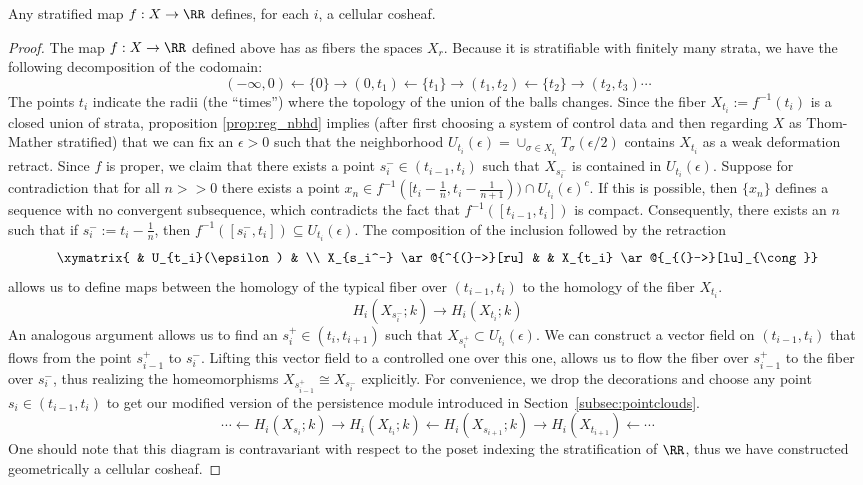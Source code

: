 \begin{lem}\label{lem:strat_maps_1d}
	Any stratified map $f:X\to\RR$ defines, for each $i$, a cellular cosheaf.
\end{lem}
\begin{proof}
The map $f:X\to \RR$ defined above has as fibers the spaces $X_r$. Because it is stratifiable with finitely many strata, we have the following decomposition of the codomain:
\[
 	(-\infty,0) \leftarrow \{0\} \rightarrow (0,t_1) \leftarrow \{t_1\} \rightarrow (t_1,t_2) \leftarrow \{t_2\} \rightarrow (t_2,t_3) \cdots
\]
The points $t_i$ indicate the radii (the ``times'') where the topology of the union of the balls changes. Since the fiber $X_{t_i}:=f^{-1}(t_i)$ is a closed union of strata, proposition \ref{prop:reg_nbhd} implies (after first choosing a system of control data and then regarding $X$ as Thom-Mather stratified) that we can fix an $\epsilon>0$ such that the neighborhood $U_{t_i}(\epsilon)=\cup_{\sigma\in X_{t_i}} T_{\sigma}(\epsilon/2)$ contains $X_{t_i}$ as a weak deformation retract. Since $f$ is proper, we claim that there exists a point $s_i^-\in (t_{i-1},t_i)$ such that $X_{s_i^-}$ is contained in $U_{t_i}(\epsilon)$. Suppose for contradiction that for all $n>>0$ there exists a point $x_n\in f^{-1}([t_i-\frac{1}{n},t_i-\frac{1}{n+1}))\cap U_{t_i}(\epsilon)^c$. If this is possible, then $\{x_n\}$ defines a sequence with no convergent subsequence, which contradicts the fact that $f^{-1}([t_{i-1},t_i])$ is compact. Consequently, there exists an $n$ such that if $s_i^-:=t_i-\frac{1}{n}$, then $f^{-1}([s_i^-,t_i])\subseteq U_{t_i}(\epsilon)$. The composition of the inclusion followed by the retraction
\[
	\xymatrix{ & U_{t_i}(\epsilon) & \\ 
	X_{s_i^-} \ar@{^{(}->}[ru] & & X_{t_i} \ar@{_{(}->}[lu]_{\cong}}
\]
allows us to define maps between the homology of the typical fiber over $(t_{i-1},t_i)$ to the homology of the fiber $X_{t_i}$.
\[
	H_i(X_{s_i^-};k)\rightarrow H_i(X_{t_i};k)
\]
An analogous argument allows us to find an $s_i^+\in (t_i,t_{i+1})$ such that $X_{s_i^+}\subset U_{t_i}(\epsilon)$. We can construct a vector field on $(t_{i-1},t_i)$ that flows from the point $s_{i-1}^+$ to $s_i^-$. Lifting this vector field to a controlled one over this one, allows us to flow the fiber over $s_{i-1}^+$ to the fiber over $s_i^-$, thus realizing the homeomorphisms $X_{s_{i-1}^+}\cong X_{s_i^-}$ explicitly. For convenience, we drop the decorations and choose any point $s_i\in (t_{i-1},t_i)$ to get our modified version of the persistence module introduced in Section~\ref{subsec:pointclouds}.
\[
	\cdots \leftarrow H_i(X_{s_i};k)\rightarrow H_i(X_{t_i};k) \leftarrow H_i(X_{s_{i+1}};k)\rightarrow H_i(X_{t_{i+1}}) \leftarrow \cdots
\]
One should note that this diagram is contravariant with respect to the poset indexing the stratification of $\RR$, thus we have constructed geometrically a cellular cosheaf.
\end{proof}

